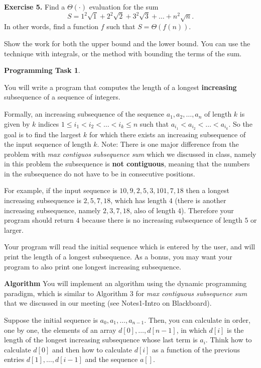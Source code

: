 \documentclass[11pt]{article}
\begin{document}
\textbf{Exercise 5.}
Find a $\Theta(\cdot)$ evaluation for the sum
\[
S = 1^2\sqrt{1} + 2^2 \sqrt{2} + 3^2 \sqrt{3} + \ldots + n^2 \sqrt{n}.
\]
In other words, find a function $f$ such that $S = \Theta(f(n))$.
\medskip

Show the work for both the upper bound and the lower bound. You can use the technique with integrals, or the  method with bounding the terms of the sum.


\newpage

\textbf{Programming Task 1}. 

You will write a program that computes the length of a longest \textbf{increasing} subsequence of a sequence of integers. 

Formally, an increasing subsequence of the sequence $a_1, a_2, \ldots, a_n$ of length $k$ is given by $k$ indices $1 \leq i_1 < i_2 < \ldots < i_k \leq n$ such that $a_{i_1} < a_{i_2} < \ldots < a_{i_k}$. So the goal is to find the largest $k$ for which there exists an increasing subsequence of the input sequence of length $k$. Note: There is one major difference from the problem with \emph{max contiguos subsequence sum} which we discussed in class, namely in this problem  the subsequence is \textbf{not contiguous}, meaning that the numbers in the subsequence do not have to be in consecutive positions.

For example, if the input sequence is $10, 9, 2, 5, 3, 101, 7, 18$ then a longest increasing subsequence is $2,5,7, 18$, which has length $4$ (there is another increasing subsequence, namely $2,3,7,18$, also of length $4$). Therefore your program should return $4$ because there is no increasing subsequence of length $5$ or larger.

Your program will read the initial sequence which is entered by the user, and will print the length of a longest subsequence.  As a bonus, you may want your program to also print one longest increasing subsequence.
\smallskip

\textbf{Algorithm}  You will implement an algorithm using the dynamic programming paradigm, which is similar to Algorithm 3 for \emph{max contiguous subsequence sum} that we discussed in our meeting
 (see  Notes1-Intro on Blackboard).

 Suppose  the initial sequence is $a_0, a_1, \ldots, a_{n-1}$. Then,  you can calculate  in order, one by one,  the elements of an array $d[0], \ldots, d[n-1]$,  in which $d[i]$ is the length of the longest increasing subsequence whose last term is $a_i$. 
Think how to calculate $d[0]$ and then how to calculate $d[i]$ as a function of the previous entries $d[1],  \dots, d[i-1]$ and the sequence $a[]$.  %
\medskip
\end{document}
